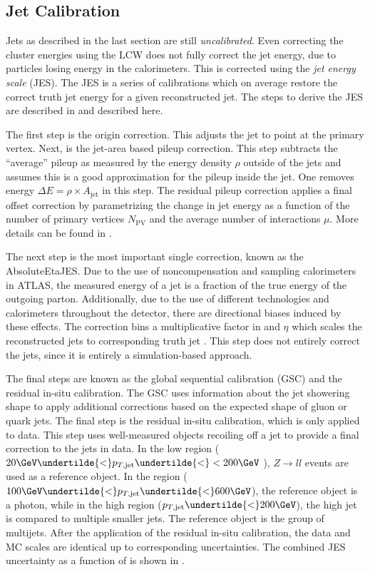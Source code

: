 \subsection{Jet Calibration}

Jets as described in the last section are still \textit{uncalibrated}.
Even correcting the cluster energies using the LCW does not fully correct the jet energy, due to particles losing energy in the calorimeters.
This is corrected using the \textit{jet energy scale} (JES).
The JES is a series of calibrations which on average restore the correct truth jet energy for a given reconstructed jet.
The steps to derive the JES are described in  and described here.

The first step is the origin correction.
This adjusts the jet to point at the primary vertex.
Next, is the jet-area based pileup correction.
This step subtracts the ``average'' pileup as measured by the energy density $\rho$ outside of the jets and assumes this is a good approximation for the pileup inside the jet.
One removes energy $\Delta E = \rho \times A_{\text{jet}}$ in this step.
The residual pileup correction applies a final offset correction by parametrizing the change in jet energy as a function of the number of primary vertices $N_{\text{PV}}$ and the average number of interactions $\mu$.
More details can be found in \cite{PERF-2012-01}.

The next step is the most important single correction, known as the AbsoluteEtaJES.
Due to the use of noncompensation and sampling calorimeters in ATLAS, the measured energy of a jet is a fraction of the true energy of the outgoing parton.
Additionally, due to the use of different technologies and calorimeters throughout the detector, there are directional biases induced by these effects.
The correction bins a multiplicative factor in \pt and $\eta$ which scales the reconstructed jets to corresponding truth jet \pt.
This step does not entirely correct the jets, since it is entirely a simulation-based approach.

The final steps are known as the global sequential calibration (GSC) and the residual in-situ calibration.
The GSC uses information about the jet showering shape to apply additional corrections based on the expected shape of gluon or quark jets.
The final step is the residual in-situ calibration, which is only applied to data.
This step uses well-measured objects recoiling off a jet to provide a final correction to the jets in data.
In the low \pt region ($20 \GeV \undertilde{<} p_{T,\text{jet}} \undertilde{<} < 200 \GeV $ ), $Z \rightarrow ll$ events are used as a reference object.
In the \pt region ($100 \GeV \undertilde{<} p_{T,\text{jet}} \undertilde{<} 600 \GeV $), the reference object is a photon, while in the high \pt region ($p_{T,\text{jet}} \undertilde{<} 200 \GeV $), the high \pt jet is compared to multiple smaller \pt jets.
The reference object is the group of multijets.
After the application of the residual in-situ calibration, the data and MC scales are identical up to corresponding uncertainties.
The combined JES uncertainty as a function of \pt is shown in .

